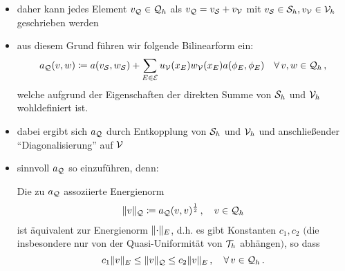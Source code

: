 \begin{itemize}
\begin{proof}
Auf dem Referenzelement $\tilde T$ ist $\{\phi_1,\phi_2,\phi_3\}$ eine Basis von $\mcal S_h$ mit
\[
	\phi_1(\xi,\eta) = 1-\xi-\eta \, , \quad \phi_2(\xi,\eta) = \xi \, , \quad \phi_3(\xi,\eta) = \eta
\]
und $\{\phi_4,\phi_5,\phi_6\}$ eine Basis von $\mcal V_h$ mit
\[
	\phi_1(\xi,\eta) = 4\xi (1-\xi-\eta) \, , \quad \phi_2(\xi,\eta) = 4\xi\eta \, , \quad \phi_3(\xi,\eta) = 4\eta(1-\xi-\eta) \, .
\]
Damit ist $\{\phi_1,\ldots,\phi_6\}$ ein Erzeugendensystem von $\mcal Q_h$, da jedes Element
\[
	a_0+a_1\xi+a_2\eta + a_3 \xi^2+ a_4\xi\eta +a_5\eta^2 \in \mcal Q_h
\]
als Linearkombination aus den Funktionen beschrieben werden kann ($\phi_1$ bis $\phi_6$ enthalten alle vorkommenden Summanden eines Polynom 2. Grades). Außerdem ist leicht nachzurechnen, dass die Funktionen $\phi_i,i = 1,\ldots,6,$ linear unabhängig sind und damit gilt
\[
	\mcal Q_h = \operatorname{span} \{\phi_1,\ldots,\phi_6\} \, .
\]
Aus der linearen Unabhängigkeit folgt damit auch $\mcal S_h \cap \mcal V_h = \{0\}$ gilt und damit die Behauptung.
\end{proof}

\item daher kann jedes Element $v_{\mathcal Q} \in \mathcal Q_h$  als $v_{\mathcal Q} = v_{\mathcal S} + v_{\mathcal V}$ mit $v_{\mathcal S} \in \mathcal S_h, v_{\mathcal V}\in \mathcal V_h$ geschrieben werden

\item aus diesem Grund führen wir folgende Bilinearform ein:
\begin{align*}
	a_{\mathcal Q} (v,w) \coloneqq a(v_{\mathcal S},w_{\mathcal S}) + \sum_{E \in \mathcal E} u_{\mathcal V}(x_E) w_{\mathcal V}(x_E) a(\phi_E,\phi_E) \quad \forall \, v,w \in \mathcal Q_h \, ,
\end{align*}
welche aufgrund der Eigenschaften der direkten Summe von $\mcal S_h$ und $\mcal V_h$ wohldefiniert ist.

\item dabei ergibt sich $a_{\mathcal Q}$ durch Entkopplung von $\mcal S_h$ und $\mcal V_h$ und anschließender "`Diagonalisierung"' auf $\mathcal V$

\item sinnvoll $a_{\mathcal Q}$ so einzuführen, denn:
\begin{satz}
Die zu $a_{\mathcal Q}$ assoziierte Energienorm
\begin{align*}
	\lVert v\rVert_{\mathcal Q}\coloneqq a_{\mathcal Q}(v,v)^{\frac 1 2} \, , \quad v \in \mathcal Q_h
\end{align*}
ist äquivalent zur Energienorm $\lVert \cdot\rVert_E$, d.h. es gibt Konstanten $c_1,c_2$ $($die insbesondere nur von der Quasi-Uniformität von $\mathcal T_h$ abhängen$)$, so dass
\[
	c_1 \lVert v\rVert_E \le \lVert v\rVert_{\mathcal Q} \le c_2 \lVert v\rVert_E \, , \quad \forall \, v \in \mathcal Q_h \, .
\]
\end{satz}


\end{itemize}
